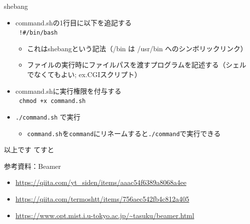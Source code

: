 \documentclass[12pt,aspectratio=169]{beamer}
\begin{document}
\begin{frame}{shebang}
  \begin{itemize}
    \item command.shの1行目に以下を追記する \\
      \texttt {
        !\#/bin/bash
      }
      \begin{itemize}
        \item これはshebangという記法（/bin は /usr/bin へのシンボリックリンク）
        \item ファイルの実行時にファイルパスを渡すプログラムを記述する（シェルでなくてもよい; ex.CGIスクリプト）
      \end{itemize}
    \item command.shに実行権限を付与する \\
      \texttt {
        chmod +x command.sh
      }
    \item \texttt{./command.sh} で実行
      \begin{itemize}
        \item \texttt{command.sh}を\texttt{command}にリネームすると\texttt{./command}で実行できる
      \end{itemize}

  \end{itemize}


\end{frame}


\begin{frame}{以上です}
てすと

\end{frame}


\begin{frame}{参考資料：Beamer}
  \begin{itemize}
    \item \url { https://qiita.com/yt_siden/items/aaac54f6389a8068a4ee }
    \item \url { https://qiita.com/termoshtt/items/756aec542fb4c812a405 }
    \item \url { https://www.opt.mist.i.u-tokyo.ac.jp/~tasuku/beamer.html }
  \end{itemize}

\end{frame}
\end{document}
